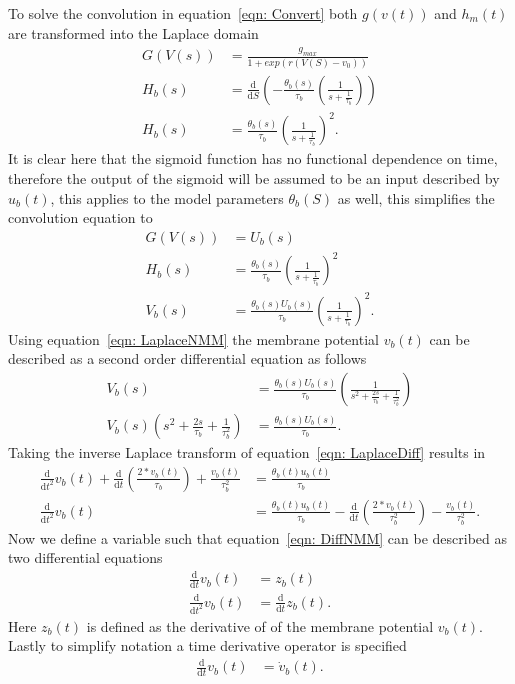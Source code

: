 To solve the convolution in equation~\ref{eqn: Convert} both $g(v(t))$ and $h_{m}(t)$ are transformed into the Laplace domain \begin{align}%
\label{eqn: Laplace}
G(V(s)) &= \frac{g_{max}}{1+exp(r(V(S)-v_{0}))}\\
H_{b}(s) &= \frac{\mathrm{d}}{\mathrm{d}S}\left(-\frac{\theta_{b}(s)}{\tau_{b}}\left(\frac{1}{s+\frac{1}{\tau_{b}}}\right)\right)\\
H_{b}(s) &= \frac{\theta_{b}(s)}{\tau_{b}}\left(\frac{1}{s+\frac{1}{\tau_{b}}}\right)^2.
\end{align} It is clear here that the sigmoid function has no functional dependence on time, therefore the output of the sigmoid will be assumed to be an input described by $u_{b}(t)$, this applies to the model parameters $\theta_{b}(S)$ as well, this simplifies the convolution equation to \begin{align}%
G(V(s)) &= U_{b}(s)\\
H_{b}(s) &= \frac{\theta_{b}(s)}{\tau_{b}}\left(\frac{1}{s+\frac{1}{\tau_{b}}}\right)^2\\
\label{eqn: LaplaceNMM}
V_{b}(s) &= \frac{\theta_{b}(s)U_{b}(s)}{\tau_{b}}\left(\frac{1}{s+\frac{1}{\tau_{b}}}\right)^2.
\end{align} Using equation~\ref{eqn: LaplaceNMM} the membrane potential $v_{b}(t)$ can be described as a second order differential equation as follows \begin{align}%
V_{b}(s) &= \frac{\theta_{b}(s)U_{b}(s)}{\tau_{b}}\left(\frac{1}{s^2+\frac{2s}{\tau_{b}}+\frac{1}{\tau^2_{b}}}\right)\\
\label{eqn: LaplaceDiff}
V_{b}(s)\left(s^2+\frac{2s}{\tau_{b}}+\frac{1}{\tau^2_{b}}\right) &= \frac{\theta_{b}(s)U_{b}(s)}{\tau_{b}}.
\end{align} Taking the inverse Laplace transform of equation~\ref{eqn: LaplaceDiff} results in \begin{align} %
\frac{\mathrm{d}}{\mathrm{d}t^2}v_{b}(t) + \frac{\mathrm{d}}{\mathrm{d}t}\left(\frac{2*v_{b}(t)}{\tau_{b}}\right) + \frac{v_{b}(t)}{\tau^2_{b}} &= \frac{\theta_{b}(t)u_{b}(t)}{\tau_{b}}\\
\label{eqn: DiffNMM}
\frac{\mathrm{d}}{\mathrm{d}t^2}v_{b}(t) &= \frac{\theta_{b}(t)u_{b}(t)}{\tau_{b}} - \frac{\mathrm{d}}{\mathrm{d}t}\left(\frac{2*v_{b}(t)}{\tau^2_{b}}\right) -\frac{v_{b}(t)}{\tau^2_{b}}. \end{align} Now we define a variable such that equation~\ref{eqn: DiffNMM} can be described as two differential equations \begin{align} %
\label{eqn: dummy1}
\frac{\mathrm{d}}{\mathrm{d}t}v_{b}(t) &= z_{b}(t)\\
\label{eqn: dummy2}
\frac{\mathrm{d}}{\mathrm{d}t^2}v_{b}(t) &= \frac{\mathrm{d}}{\mathrm{d}t}z_{b}(t).\end{align} Here $z_{b}(t)$ is defined as the derivative of of the membrane potential $v_{b}(t)$. Lastly to simplify notation a time derivative operator is specified \begin{align}%
\label{eqn: DiffOp}
\frac{\mathrm{d}}{\mathrm{d}t}v_{b}(t) &= \dot{v}_{b}(t).
\end{align} %
